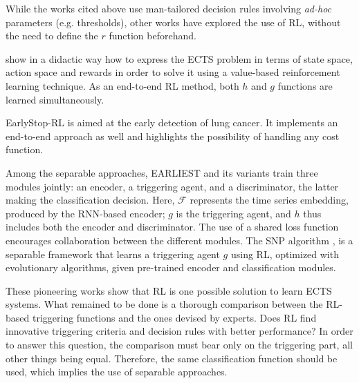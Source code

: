 \documentclass[sigconf, nonacm, table]{acmart}
\begin{document}
While the works cited above use man-tailored decision rules involving \textit{ad-hoc} parameters (e.g. thresholds), other works have explored the use of RL, without the need to define the $r$ function beforehand.

\cite{martinez2018deep, martinez2020adaptive} show in a didactic way how to express the ECTS problem in terms of state space, action space and rewards in order to solve it using a value-based reinforcement learning technique. As an end-to-end RL method, both $h$ and $g$ functions are learned simultaneously.

EarlyStop-RL \cite{wang2024deep} is aimed at the early detection of lung cancer. It implements an end-to-end approach as well and highlights the possibility of handling any cost function. 

Among the separable approaches, EARLIEST and its variants \cite{hartvigsen2019adaptive, hartvigsen2020recurrent, hartvigsen2022stop} train three modules jointly: an encoder, a triggering agent, and a discriminator, the latter making the classification decision. Here, $\mathcal{F}$ represents the time series embedding, produced by the RNN-based encoder; $g$ is the triggering agent, and $h$ thus includes both the encoder and discriminator. The use of a shared loss function encourages collaboration between the different modules. 
The SNP algorithm \cite{huang2022snippet1, huang2022snippet}, is a separable framework that learns a triggering agent $g$ using RL, optimized with evolutionary algorithms, given pre-trained encoder and classification modules.

These pioneering works show that RL is one possible solution to learn ECTS systems. What remained to be done is a thorough comparison between the RL-based triggering functions and the ones devised by experts. Does RL find innovative triggering criteria and decision rules with better performance? In order to answer this question, the comparison must bear only on the triggering part, all other things being equal. Therefore, the same classification function should be used, which implies the use of separable approaches.







 
  
\end{document}
